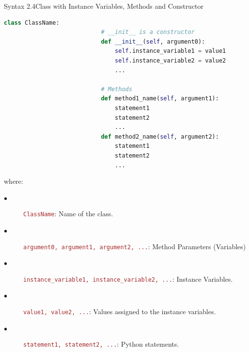 \documentclass{book}
\begin{document}
    \begin{synBox}[]{Syntax 2.4}{Class with Instance Variables, Methods and Constructor}
        \begin{lstlisting}[language=Python, basicstyle=\ttfamily\small, keywordstyle=\color{blue}, commentstyle=\color{forestgreen}, stringstyle=\color{red}, showstringspaces=false]
                        class ClassName:
                            # __init__ is a constructor
                            def __init__(self, argument0):
                                self.instance_variable1 = value1
                                self.instance_variable2 = value2
                                ...

                            # Methods
                            def method1_name(self, argument1):
                                statement1
                                statement2
                                ...
                            def method2_name(self, argument2):
                                statement1
                                statement2
                                ...
        \end{lstlisting} 
    \raggedright
    where: \\
    \begin{description}
        \item[$\bullet$] \texttt{\textcolor{brown}{ClassName}}: Name of the class.
        \item[$\bullet$] \texttt{\textcolor{brown}{argument0, argument1, argument2, ...}}: Method Parameters (Variables)
        \item[$\bullet$] \texttt{\textcolor{brown}{instance\_variable1, instance\_variable2, ...}}: Instance Variables.
        \item[$\bullet$] \texttt{\textcolor{brown}{value1, value2, ...}}: Values assigned to the instance variables.
        \item[$\bullet$] \texttt{\textcolor{brown}{statement1, statement2, ...}}: Python statements.
    \end{description}
    \end{synBox}
\end{document}
